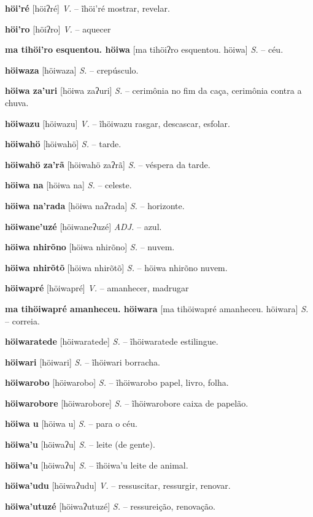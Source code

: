 \textbf{höi'ré} [höiʔré] \textit{V.} -- ĩhöi'ré mostrar, revelar.

\textbf{höi'ro} [höiʔro] \textit{V.} -- aquecer

\textbf{ma tihöi'ro esquentou. höiwa} [ma tihöiʔro esquentou. höiwa] \textit{S.} -- céu.

\textbf{höiwaza} [höiwaza] \textit{S.} -- crepúsculo.

\textbf{höiwa za'uri} [höiwa zaʔuri] \textit{S.} -- cerimônia no fim da caça, cerimônia contra a chuva.

\textbf{höiwazu} [höiwazu] \textit{V.} -- ĩhöiwazu rasgar, descascar, esfolar.

\textbf{höiwahö} [höiwahö] \textit{S.} -- tarde.

\textbf{höiwahö za'rã} [höiwahö zaʔrã] \textit{S.} -- véspera da tarde.

\textbf{höiwa na} [höiwa na] \textit{S.} -- celeste.

\textbf{höiwa na'rada} [höiwa naʔrada] \textit{S.} -- horizonte.

\textbf{höiwane'uzé} [höiwaneʔuzé] \textit{ADJ.} -- azul.

\textbf{höiwa nhirõno} [höiwa nhirõno] \textit{S.} -- nuvem.

\textbf{höiwa nhirõtõ} [höiwa nhirõtõ] \textit{S.} -- höiwa nhirõno nuvem.

\textbf{höiwapré} [höiwapré] \textit{V.} -- amanhecer, madrugar

\textbf{ma tihöiwapré amanheceu. höiwara} [ma tihöiwapré amanheceu. höiwara] \textit{S.} -- correia.

\textbf{höiwaratede} [höiwaratede] \textit{S.} -- ĩhöiwaratede estilingue.

\textbf{höiwari} [höiwari] \textit{S.} -- ĩhöiwari borracha.

\textbf{höiwarobo} [höiwarobo] \textit{S.} -- ĩhöiwarobo papel, livro, folha.

\textbf{höiwarobore} [höiwarobore] \textit{S.} -- ĩhöiwarobore caixa de papelão.

\textbf{höiwa u} [höiwa u] \textit{S.} -- para o céu.

\textbf{höiwa'u} [höiwaʔu] \textit{S.} -- leite (de gente).

\textbf{höiwa'u} [höiwaʔu] \textit{S.} -- ĩhöiwa'u leite de animal.

\textbf{höiwa'udu} [höiwaʔudu] \textit{V.} -- ressuscitar, ressurgir, renovar.

\textbf{höiwa'utuzé} [höiwaʔutuzé] \textit{S.} -- ressureição, renovação.

